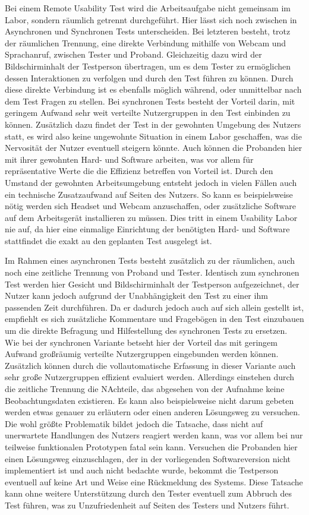 Bei einem Remote Usability Test wird die Arbeitsaufgabe nicht gemeinsam im Labor, sondern räumlich getrennt durchgeführt.
Hier lässt sich noch zwischen in Asynchronen und Synchronen Tests unterscheiden.
Bei letzteren besteht, trotz der räumlichen Trennung, eine direkte Verbindung mithilfe von Webcam und Sprachanruf, zwischen Tester und Proband.
Gleichzeitig dazu wird der Bildschirminhalt der Testperson übertragen, um es dem Tester zu ermöglichen dessen Interaktionen  zu verfolgen und durch den Test führen zu können.
Durch diese direkte Verbindung ist es ebenfalls möglich während, oder unmittelbar nach dem Test Fragen zu stellen.
Bei synchronen Tests besteht der Vorteil darin, mit geringem Aufwand sehr weit verteilte Nutzergruppen in den Test einbinden zu können.
Zusätzlich dazu findet der Test in der gewohnten Umgebung des Nutzers statt, es wird also keine ungewohnte Situation in einem Labor geschaffen, was die Nervosität der Nutzer eventuell steigern könnte.
Auch können die Probanden hier mit ihrer gewohnten Hard- und Software arbeiten, was vor allem für repräsentative Werte die die Effizienz betreffen von Vorteil ist.
Durch den Umstand der gewohnten Arbeitsumgebung entsteht jedoch in vielen Fällen auch ein technische Zusatzaufwand auf Seiten des Nutzers.
So kann es beispielsweise nötig werden sich Headset und Webcam anzuschaffen, oder zusätzliche Software auf dem Arbeitsgerät installieren zu müssen.
Dies tritt in einem Usability Labor nie auf, da hier eine einmalige Einrichtung der benötigten Hard- und Software stattfindet die exakt au den geplanten Test ausgelegt ist.

Im Rahmen eines asynchronen Tests besteht zusätzlich zu der räumlichen, auch noch eine zeitliche Trennung von Proband und Tester.
Identisch zum synchronen Test werden hier Gesicht und Bildschirminhalt der Testperson aufgezeichnet, der Nutzer kann jedoch aufgrund der Unabhängigkeit den Test zu einer ihm passenden Zeit durchführen.
Da er dadurch jedoch auch auf sich allein gestellt ist, empfiehlt es sich zusätzliche Kommentare und Fragebögen in den Test einzubauen um die direkte Befragung und Hilfestellung des synchronen Tests zu ersetzen.
Wie bei der synchronen Variante betseht hier der Vorteil das mit geringem Aufwand großräumig verteilte Nutzergruppen eingebunden werden können.
Zusätzlich können durch die vollautomatische Erfassung in dieser Variante auch sehr große Nutzergruppen effizient evaluiert werden.
Allerdings einstehen durch die zeitliche Trennung die NAchteile, das abgesehen von der Aufnahme keine Beobachtungsdaten existieren.
Es kann also beispielsweise nicht darum gebeten werden etwas genauer zu erläutern oder einen anderen Lösungsweg zu versuchen.
Die wohl größte Problematik bildet jedoch die Tatsache, dass nicht auf unerwartete Handlungen des Nutzers reagiert werden kann, was vor allem bei nur teilweise funktionalen Prototypen fatal sein kann.
Versuchen die Probanden hier einen Lösungsweg einzuschlagen, der in der vorliegenden Softwareversion nicht implementiert ist und auch nicht bedachte wurde, bekommt die Testperson eventuell auf keine Art und Weise eine Rückmeldung des Systems.
Diese Tatsache kann ohne weitere Unterstützung durch den Tester eventuell zum Abbruch des Test führen, was zu Unzufriedenheit auf Seiten des Testers und Nutzers führt.\cite{Sarodnick.2016}

